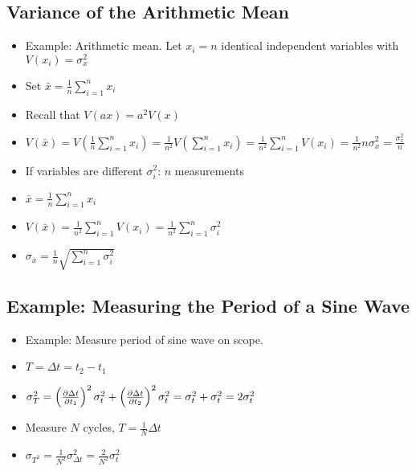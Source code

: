 \subsection{Variance of the Arithmetic Mean}

\begin{itemize}
      \item Example: Arithmetic mean. Let $x_i = n$ identical independent variables with $V(x_i) = \sigma_x^2$
      \item Set $\bar{x} = \frac{1}{n} \sum_{i=1}^{n} x_i$
      \item Recall that $V(a x) = a^2 V(x)$
      \item $V(\bar{x}) = V\left(\frac{1}{n} \sum_{i=1}^{n} x_i\right) = \frac{1}{n^2} V\left(\sum_{i=1}^{n} x_i\right) = \frac{1}{n^2} \sum_{i=1}^{n} V(x_i) = \frac{1}{n^2} n \sigma_x^2 = \frac{\sigma_x^2}{n}$
      \item If variables are different $\sigma_i^2$: $n$ measurements
      \item $\bar{x} = \frac{1}{n} \sum_{i=1}^{n} x_i$
      \item $V(\bar{x}) = \frac{1}{n^2} \sum_{i=1}^{n} V(x_i) = \frac{1}{n^2} \sum_{i=1}^{n} \sigma_i^2$
      \item $\sigma_{\bar{x}} = \frac{1}{n} \sqrt{\sum_{i=1}^{n} \sigma_i^2}$
\end{itemize}

\subsection{Example: Measuring the Period of a Sine Wave}

\begin{itemize}
      \item Example: Measure period of sine wave on scope.
      \item $T = \Delta t = t_2 - t_1$
      \item $\sigma_T^2 = \left(\pdv{\Delta t}{t_1} \right)^2 \sigma_{t}^2 + \left(\pdv{\Delta t}{t_2} \right)^2 \sigma_{t}^2 = \sigma_t^2 + \sigma_t^2 = 2 \sigma_t^2$
      \item Measure $N$ cycles, $T = \frac{1}{N} \Delta t $
      \item $ \sigma_{T^2} = \frac{1}{N^2} \sigma_{\Delta t}^2 = \frac{2}{N^2} \sigma_t^2$
\end{itemize}
